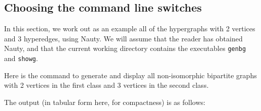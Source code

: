 \subsection{Choosing the command line switches}
\label{sec:nautycommandline}

In this section, we work out as an example all of the hypergraphs with 2 vertices and 3 hyperedges, using Nauty.
We will assume that the reader has obtained Nauty, and that the current working directory contains the executables \texttt{genbg} and \texttt{showg}.

Here is the command to generate and display all non-isomorphic bipartite graphs with 2 vertices in the first class and 3 vertices in the second class.


The output (in tabular form here, for compactness) is as follows:

